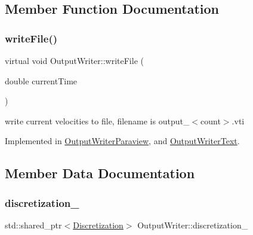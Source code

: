 \subsection{Member Function Documentation}
\mbox{\label{classOutputWriter_ac625c204affdc05919388a3549c2e945}} 
\subsubsection{\texorpdfstring{writeFile()}{writeFile()}}
{\footnotesize\ttfamily virtual void Output\+Writer\+::write\+File (\begin{DoxyParamCaption}\item[{double}]{current\+Time }\end{DoxyParamCaption})\hspace{0.3cm}{\ttfamily [pure virtual]}}



write current velocities to file, filename is output\+\_\+$<$count$>$.\+vti 



Implemented in \mbox{\hyperlink{classOutputWriterParaview_a9e203b63d0e2f26ad53d18ee1821c6bb}{Output\+Writer\+Paraview}}, and \mbox{\hyperlink{classOutputWriterText_a25a12ea2524fc34e9acb19ef1f4c7431}{Output\+Writer\+Text}}.



\subsection{Member Data Documentation}
\mbox{\label{classOutputWriter_a0587b2dc160a9b1393411433dfc23b68}} 
\subsubsection{\texorpdfstring{discretization\_}{discretization\_}}
{\footnotesize\ttfamily std\+::shared\+\_\+ptr$<$\mbox{\hyperlink{classDiscretization}{Discretization}}$>$ Output\+Writer\+::discretization\+\_\+\hspace{0.3cm}{\ttfamily [protected]}}

\mbox{\label{classOutputWriter_a69d167e2526407602dce26ca7a2b9248}} 

